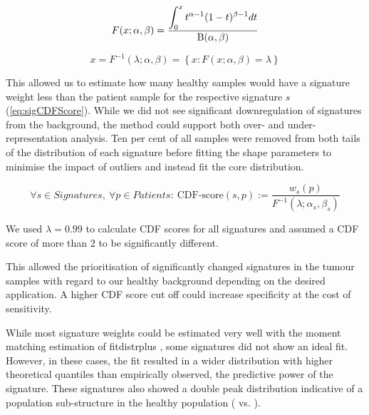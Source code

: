 \begin{equation}
F(x; \alpha ,\beta) = \frac{\displaystyle\int_{0}^{x} t^{\alpha-1}(1-t)^{\beta-1} dt}{\mathrm{B}(\alpha, \beta)}
\label{eq:betaCDF} 
\end{equation}
\myequation[\ref{eq:betaCDF}]{Beta distribution cumulative density function}

\begin{equation}
x = F^{-1}(\lambda; \alpha ,\beta) = \left\{ x: F(x; \alpha, \beta) = \lambda \right\}
\label{eq:invBetaCDF} 
\end{equation}
\myequation[\ref{eq:invBetaCDF}]{Inverse beta distribution cumulative density function}


This allowed us to estimate how many healthy samples would have a signature weight less than the patient sample for the respective signature $s$ (\autoref{eq:sigCDFScore}). While we did not see significant downregulation of signatures from the background, the method could support both over- and under-re\-pre\-sentation analysis. Ten per cent of all samples were removed from both tails of the distribution of each signature before fitting the shape parameters to minimise the impact of outliers and instead fit the core distribution.

\begin{equation}
\forall s \in Signatures,\ \forall p \in Patients:\ \text{CDF-score}(s,p) := \frac{w_s(p)}{F^{-1}(\lambda; \alpha_s ,\beta_s)}
\label{eq:sigCDFScore}
\end{equation}
\myequation[\ref{eq:sigCDFScore}]{MisMatchFinder: CDF score calculation per signature and patient}

We used $\lambda = 0.99$ to calculate CDF scores for all signatures and assumed a CDF score of more than 2 to be significantly different.

This allowed the prioritisation of significantly changed signatures in the tumour samples with regard to our healthy background depending on the desired application. A higher CDF score cut off could increase specificity at the cost of sensitivity.

While most signature weights could be estimated very well with the moment matching estimation of fitdistrplus \cite{DelignetteMuller2015}, some signatures did not show an ideal fit. However, in these cases, the fit resulted in a wider distribution with higher theoretical quantiles than empirically observed,  the predictive power of the signature. These signatures also showed a double peak distribution indicative of a population sub-structure in the healthy population ( vs. ).


